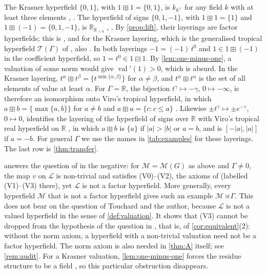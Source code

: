 \documentclass[11pt]{amsart}
\numberwithin{equation}{section}
\newcommand{\hplus}{\boxplus}
\newcommand{\hminus}{\boxminus}
\newcommand{\val}{\operatorname{val}}
\newcommand{\Mas}{\mathcal M}
\newcommand{\Lay}{\mathcal L}
\begin{document}
\begin{remark}\label{rem:table}
The Krasner hyperfield $\{0,1\}$, with $1\hplus1=\{0,1\}$, is $k_{k^\times}$ for any field $k$ with at least three elements \cite[Example~2.10]{BakerBowler19}, \cite[Proposition~2.17(i)]{Linzi25}. The hyperfield of signs $\{0,1,-1\}$, with $1\hplus1=\{1\}$ and $1\hplus(-1)=\{0,1,-1\}$, is $\mathbb R_{\mathbb R_{>0}}$ \cite[Example~2.13]{BakerBowler19}, \cite[Proposition~2.17(ii)]{Linzi25}. By \cref{prop:lift}, their layerings are factor hyperfields; this is \cite[proof of Theorem~7.5, Cases~1 and~2]{BowlerSu21}, and for the Krasner layering, which is the generalised tropical hyperfield $\mathcal T(\Gamma)$ of \cite[Example~2.14]{Linzi25}, also \cite[Proposition~2.17(iv)]{Linzi25}. In both layerings $-1=(-1)\,t^0$ and $1\in1\hplus(-1)$ in the coefficient hyperfield, so $1=t^0\in1\hminus1$. By \cref{lem:one-minus-one}, a valuation of some norm would give $\val'(1)>0$, which is absurd. In the Krasner layering, $t^\alpha\hplus t^\beta=\{t^{\min\{\alpha,\beta\}}\}$ for $\alpha\ne\beta$, and $t^\alpha\hplus t^\alpha$ is the set of all elements of value at least $\alpha$. For $\Gamma=\mathbb R$, the bijection $t^\gamma\mapsto-\gamma$, $0\mapsto-\infty$, is therefore an isomorphism onto Viro's tropical hyperfield, in which $a\hplus b=\{\max\{a,b\}\}$ for $a\ne b$ and $a\hplus a=\{c:c\le a\}$ \cite[\S5.3]{Viro10}. Likewise $\pm t^\gamma\mapsto\pm e^{-\gamma}$, $0\mapsto0$, identifies the layering of the hyperfield of signs over $\mathbb R$ with Viro's tropical real hyperfield on $\mathbb R$ \cite[\S7.2]{Viro10}, in which $a\hplus b$ is $\{a\}$ if $|a|>|b|$ or $a=b$, and is $[-|a|,|a|]$ if $a=-b$. For general $\Gamma$ we use the names in \cref{tab:examples} for these layerings. The last row is \cref{thm:transfer}.
\end{remark}

\begin{remark}\label{rem:B-scope}
 answers the question of \cite[\S7(2)]{Linzi25} in the negative: for $\Mas=\Mas(G)$ as above and $\Gamma\ne0$, the map $v$ on $\Lay$ is non-trivial and satisfies (V0)--(V2), the axioms of \cite[Definition~3.1]{Linzi25} (labelled (V1)--(V3) there), yet $\Lay$ is not a factor hyperfield. More generally, every hyperfield $\Mas$ that is not a factor hyperfield gives such an example $\Mas\rtimes\Gamma$. This does not bear on the question of Touchard and the author, because $\Lay$ is not a valued hyperfield in the sense of \cref{def:valuation}. It shows that (V3) cannot be dropped from the hypothesis of the question in \cite[Remark~4.12]{Linzi25}, that is, of \cref{cor:equivalent}(2): without the norm axiom, a hyperfield with a non-trivial valuation need not be a factor hyperfield. The norm axiom is also needed in \cref{thm:A} itself; see \cref{rem:audit}. For a Krasner valuation, \cref{lem:one-minus-one} forces the residue structure to be a field \cite[Proposition~4.14]{Linzi25}, so this particular obstruction disappears.
\end{remark}
\end{document}

